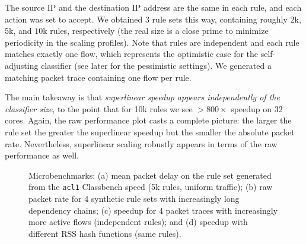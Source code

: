 \noindent %
The source IP and the destination IP address are the same in each rule, and each action was set to accept. We obtained 3 rule sets this way, containing roughly $2$k, $5$k, and $10$k rules, respectively (the real size is a close prime to minimize periodicity in the scaling profiles). Note that rules are independent and each rule matches exactly one flow, which represents the optimistic case for the self-adjusting classifier (see later for the pessimistic settings). We generated a matching packet trace containing one flow per rule.

The main takeaway is that \emph{superlinear speedup appears independently of the classifier size}, to the point that for 10k rules we see $>800\times$ speedup on 32 cores. Again, the raw performance plot casts a complete picture: the larger the rule set the greater the superlinear speedup but the smaller the absolute packet rate. Nevertheless, superlinear scaling robustly appears in terms of the raw performance as well.

\begin{figure*}[t]
  \centering
  \hspace{-1.4em}
  \hspace{-1.4em}
  \hspace{-1.4em}
  \caption{Microbenchmarks: (a) mean packet delay on the rule set generated from the \texttt{acl1} Classbench speed (5k rules, uniform traffic); (b) raw packet rate for 4 synthetic rule sets with increasingly long dependency chains; (c) speedup for 4 packet traces with increasingly more active flows (independent rules); and (d) speedup with different RSS hash functions (same rules).}
  \label{fig:microbenchmark}
\end{figure*}

